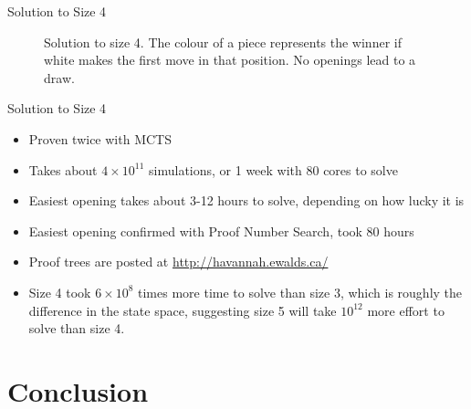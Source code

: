 \documentclass{beamer} %
\begin{document}
\begin{frame}{Solution to Size 4}
\begin{figure}[tb]
\centering
	\begin{HavannahBoard}[board size=4,coordinate style=classical,show coordinates=false]
	\end{HavannahBoard}
\caption{Solution to size 4. The colour of a piece represents the winner if white makes the first move in that position. No openings lead to a draw.}
\end{figure}
\end{frame}

\begin{frame}{Solution to Size 4}
\begin{itemize}
\item Proven twice with MCTS
\item Takes about $4 \times 10^{11}$ simulations, or 1 week with 80 cores to solve
\item Easiest opening takes about 3-12 hours to solve, depending on how lucky it is
\item Easiest opening confirmed with Proof Number Search, took 80 hours
\item Proof trees are posted at \url{http://havannah.ewalds.ca/}
\item Size 4 took $6 \times 10^8$ times more time to solve than size 3, which is roughly the difference in the state space, suggesting size 5 will take $10^{12}$ more effort to solve than size 4.
\end{itemize}
\end{frame}

%


\section{Conclusion}

\end{document}
